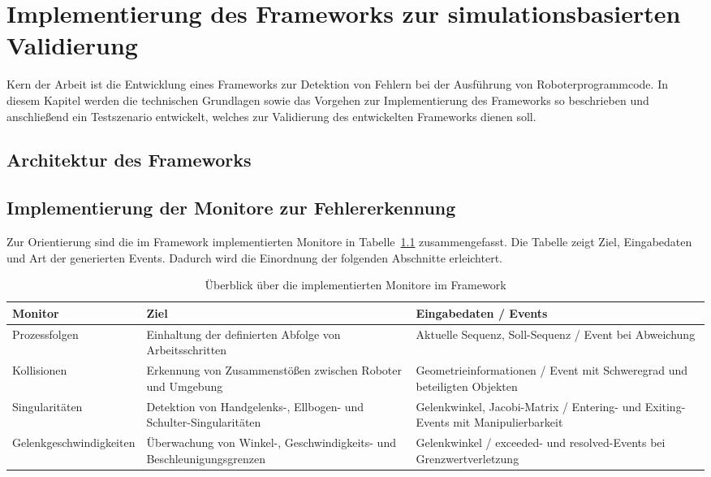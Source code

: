 \chapter{Implementierung des Frameworks zur simulationsbasierten
Validierung}
\label{sec:framework}
Kern der Arbeit ist die Entwicklung eines Frameworks zur Detektion von Fehlern
bei der Ausführung von Roboterprogrammcode. In diesem Kapitel werden
die technischen Grundlagen sowie das Vorgehen zur
Implementierung des Frameworks so beschrieben und anschließend ein Testszenario
entwickelt, welches zur Validierung des entwickelten Frameworks dienen soll.

\section{Architektur des Frameworks}
\label{sec:architektur_frameowork}


\section{Implementierung der Monitore zur Fehlererkennung}

Zur Orientierung sind die im Framework implementierten Monitore in
Tabelle~\ref{tab:monitor_overview_arch} zusammengefasst. Die Tabelle zeigt Ziel,
Eingabedaten und Art der generierten Events. Dadurch wird die Einordnung der
folgenden Abschnitte erleichtert.

\begin{table}[H]
  \centering
  \small
  \begin{tabularx}{\textwidth}{lXX}
    \toprule
    \textbf{Monitor}        & \textbf{Ziel}
    & \textbf{Eingabedaten / Events} \\
    \midrule
    Prozessfolgen           & Einhaltung der definierten Abfolge von
    Arbeitsschritten               &
    Aktuelle Sequenz, Soll-Sequenz / Event bei Abweichung
    \\
    \addlinespace
    Kollisionen             & Erkennung von Zusammenstößen zwischen
    Roboter und Umgebung            &
    Geometrieinformationen / Event mit Schweregrad und beteiligten
    Objekten                                                          \\
    \addlinespace
    Singularitäten          & Detektion von Handgelenks-, Ellbogen- und
    Schulter-Singularitäten              &
    Gelenkwinkel, Jacobi-Matrix / Entering- und Exiting-Events mit
    Manipulierbarkeit                                                      \\
    \addlinespace
    Gelenkgeschwindigkeiten & Überwachung von Winkel-,
    Geschwindigkeits- und Beschleunigungsgrenzen &
    Gelenkwinkel / exceeded- und resolved-Events bei
    Grenzwertverletzung
    \\
    \bottomrule
  \end{tabularx}
  \caption{Überblick über die implementierten Monitore im Framework}
  \label{tab:monitor_overview_arch}
\end{table}

